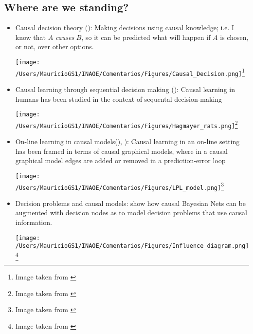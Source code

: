 \documentclass[a0,portrait]{a0poster}
\begin{document}
\begin{multicols}{3}
\subsection*{Where are we standing?}
\begin{itemize}
\item Causal decision theory (\cite{joyce1999foundations}): Making decisions using causal knowledge; i.e. I know that $A$ \textit{causes} $B$, so it can be predicted what will happen if $A$ is chosen, or not, over other options. 
\begin{center}
\texttt{[image: /Users/MauricioGS1/INAOE/Comentarios/Figures/Causal\_Decision.png]}\footnote{Image taken from \cite{hagmayer2013repeated}}
\end{center}
\item Causal learning through sequential decision making (\cite{hagmayer2013repeated}): Causal learning in humans has been studied in the context of sequental decision-making
\begin{center}
\texttt{[image: /Users/MauricioGS1/INAOE/Comentarios/Figures/Hagmayer\_rats.png]}\footnote{Image taken from \cite{hagmayer2013repeated}}
\end{center}
\item On-line learning in causal models(\cite{wellen2012learning}), \cite{garnelo2016towards}):  Causal learning in an on-line setting has been framed in terms of causal graphical models, where in a causal graphical model edges are added or removed in a prediction-error loop
\begin{center}
\texttt{[image: /Users/MauricioGS1/INAOE/Comentarios/Figures/LPL\_model.png]}\footnote{Image taken from \cite{wellen2012learning}}
\end{center}
\item Decision problems and causal models: \cite{dawid2002influence} show how causal Bayesian Nets can be augmented with decision nodes as to model decision problems that use causal information.
\begin{center}
\texttt{[image: /Users/MauricioGS1/INAOE/Comentarios/Figures/Influence\_diagram.png]}\footnote{Image taken from \cite{dawid2002influence}}
\end{center}
\end{itemize}


\end{multicols}
\end{document}
